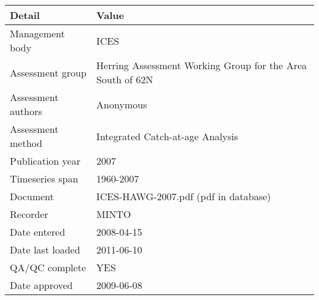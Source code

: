 \begin{table}[htb]
\centering
\begin{tabular}{lp{7cm}}
\toprule
Detail & Value \\
\midrule
Management body    & ICES                                                       \\
Assessment group   & Herring Assessment Working Group for the Area South of 62N \\
Assessment authors & Anonymous                                                  \\
Assessment method  & Integrated Catch-at-age Analysis                           \\
Publication year   & 2007                                                       \\
Timeseries span    & 1960-2007                                                  \\
Document           & ICES-HAWG-2007.pdf (pdf in database)                       \\
Recorder           & MINTO                                                      \\
Date entered       & 2008-04-15                                                 \\
Date last loaded   & 2011-06-10                                                 \\
QA/QC complete     & YES                                                        \\
Date approved      & 2009-06-08                                                 \\
\bottomrule
\end{tabular}
\label{tab:assessdet}
\end{table}
